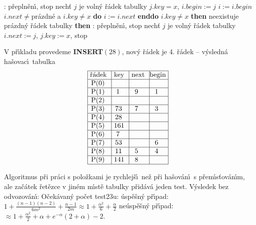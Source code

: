 \phantom{---------}{\bf V\'ystup}: p\v repln\v en\'\i , stop\newline 
\phantom{------}{\bf else}\newline 
\phantom{---------}nech\v t $j$ je voln\'y \v r\'adek tabulky\newline 
\phantom{---------}$j.key=x$, $i.begin:=j$\newline 
\phantom{------}{\bf endif}\newline
\phantom{---}{\bf endif\newline 
else}\newline
\phantom{---}$i:=i.begin$
\phantom{---}{\bf while} $i.next\ne$pr\'azdn\'e a $i.key\ne x$ {\bf do} $i:=i.next$ {\bf enddo}\newline 
\phantom{---}{\bf if} $i.key\ne x$ {\bf then}\newline 
\phantom{------}{\bf if} neexistuje pr\'azdn\'y \v r\'adek tabulky {\bf then}\newline 
\phantom{---------}{\bf V\'ystup}: p\v repln\v en\'\i , stop\newline 
\phantom{------}{\bf else}\newline 
\phantom{---------}nech\v t $j$ je voln\'y \v r\'adek tabulky\newline 
\phantom{---------}$i.next:=j$, $j.key:=x$, stop\newline 
\phantom{------}{\bf endif}\newline
\phantom{---}{\bf endif\newline 
endif}
\bigskip

\flushpar V p\v r\'\i kladu provedeme {\bf INSERT$(28)$}, nov\'y \v r\'adek je 4. 
\v r\'adek\newline 
-- v\'ysledn\'a ha\v sovac\'\i\ tabulka
$$\vtop{\offinterlineskip\halign {\strut\vrule\ # & \vrule\ # & \vrule\ # & \vrule \hfil # \hfil \vrule\cr\noalign{\hrule}\v r\'adek & key & next & begin\hfil \cr\noalign{\hrule}P(0) & & &\hfill \cr\noalign{\hrule}P(1) & 1 & 9 & 1 \cr\noalign{\hrule}P(2) & & &\hfill \cr\noalign{\hrule}P(3) & 73 & 7 & 3 \cr\noalign{\hrule}P(4) & 28 &  &\hfill \cr\noalign{\hrule}P(5) & 161 & & \hfill \cr\noalign{\hrule}P(6) & 7 & &\hfill \cr\noalign{\hrule}P(7) & 53 & & 6 \cr\noalign{\hrule}P(8) & 11 & 5 & 4  \cr\noalign{\hrule}P(9) & 141 & 8 & \hfill \cr\noalign{\hrule}}}$$

\flushpar Algoritmus p\v ri pr\'aci s polo\v zkami je rychlej\v s\'\i\ ne\v z p\v ri 
ha\v sov\'an\'\i\ s p\v rem\'\i s\v tov\'an\'\i m, ale za\v c\'atek \v ret\v ezce v 
jin\'em m\'\i st\v e tabulky p\v rid\'av\'a jeden test. V\'ysledek bez 
odvozov\'an\'\i :\newline 
O\v cek\'avan\'y po\v cet test\accent23u:\newline 
\phantom{---}\'usp\v e\v sn\'y p\v r\'\i pad: $1+\frac {(n-1)(n-2)}{6m^2}+\frac {
n-1}{2m}\approx 1+\frac {\alpha^2}6+\frac {\alpha}2$\newline 
\phantom{---}ne\'usp\v e\v sn\'y p\v r\'\i pad: $\approx 1+\frac {\alpha^2}2+\alpha 
+e^{-\alpha}(2+\alpha )-2$.

